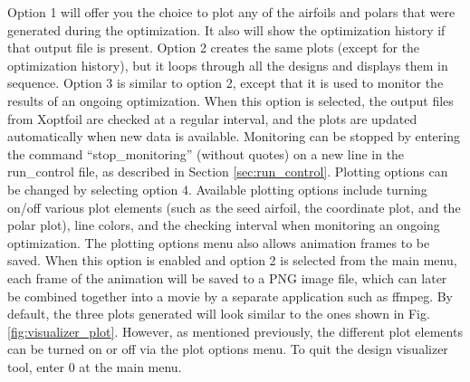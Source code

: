 \documentclass[11pt]{article}
\begin{document}
Option 1 will offer you the choice to plot any of the airfoils and polars that were
generated during the optimization. It also will show the optimization history if that
output file is present. Option 2 creates the same plots (except for the optimization 
history), but it loops through all the designs and displays them in sequence. Option 3 is
similar to option 2, except that it is used to monitor the results of an ongoing
optimization. When this option is selected, the output files from Xoptfoil are checked at
a regular interval, and the plots are updated automatically when new data is available. 
Monitoring can be stopped by entering the command ``stop\_monitoring'' (without quotes) on
a new line in the run\_control file, as described in Section \ref{sec:run_control}.
Plotting options can be 
changed by selecting option 4.  Available plotting options include turning on/off various
plot elements (such as the seed airfoil, the coordinate  plot, and the polar plot), line 
colors, and the checking interval when monitoring an ongoing optimization.  The plotting 
options menu also allows animation frames to be saved. When this option is enabled and 
option 2 is selected from the main menu, each frame of the animation will be saved to a
PNG image file, which can later be combined together into a movie by a separate
application such as ffmpeg.  By default, the three plots generated  will look similar to 
the ones shown in Fig. \ref{fig:visualizer_plot}.  However, as mentioned
previously, the different plot elements can be turned on or off via the plot options menu.
To quit the design visualizer tool, enter 0 at the main menu.
\end{document}
